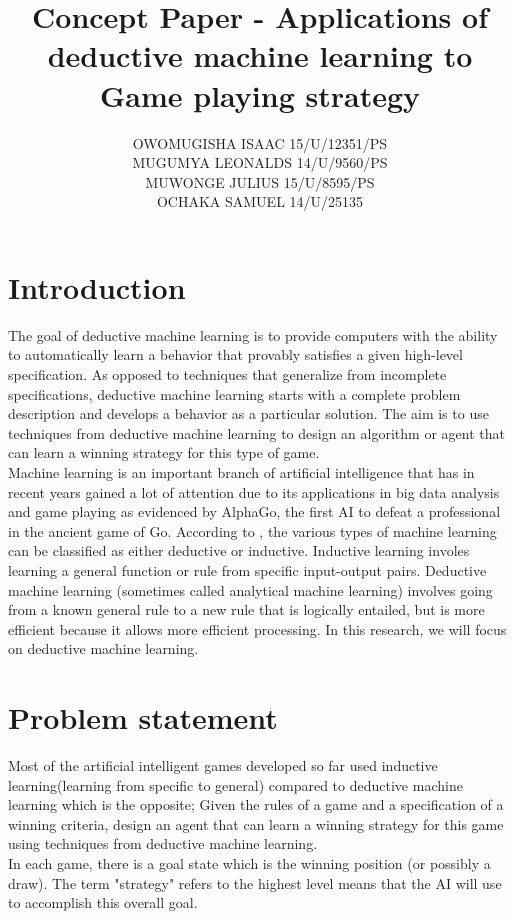 \documentclass[11pt]{article}
\title{Concept Paper - Applications of deductive machine learning to Game playing strategy}
\author{OWOMUGISHA ISAAC \hspace{1cm}15/U/12351/PS\\ MUGUMYA LEONALDS \hspace{1cm} 14/U/9560/PS\\MUWONGE JULIUS \hspace{1cm} 15/U/8595/PS \\ OCHAKA SAMUEL \hspace{1cm} 14/U/25135}
\date{}
\begin{document}
\maketitle

\section{Introduction}
The goal of deductive machine learning is to provide computers with the ability to automatically learn a behavior that provably satisfies a given high-level specification. As opposed to techniques that generalize from incomplete specifications, deductive machine learning starts with a complete problem description and develops a behavior as a particular solution. The aim is to use techniques from deductive machine learning to design an algorithm or agent that can learn a winning strategy for this type of game.\\

Machine learning is an important branch of artificial intelligence that has in recent years gained a lot of attention due to its applications in big data analysis and game playing as evidenced by AlphaGo, the first AI to defeat a professional in the ancient game of Go.
According to \cite{russell2010artificial}, the various types of machine learning can be classified as either deductive or inductive. Inductive learning involes learning a general function or rule from specific input-output pairs. Deductive machine learning (sometimes called analytical machine learning) involves going from a known general rule to a new rule that is logically entailed, but is more efficient because it allows more efficient processing. In this research, we will focus on deductive machine learning.\\

\section{Problem statement}
Most of the artificial intelligent games developed so far used inductive learning(learning from specific to general) compared to deductive machine learning which is the opposite; Given the rules of a game and a specification of a winning criteria, design an agent that can learn a winning strategy for this game using techniques from deductive machine learning.\\

In each game, there is a goal state which is the winning position (or possibly a draw). The term "strategy" refers to the highest level means that the AI will use to accomplish this overall goal.
\end{document}
